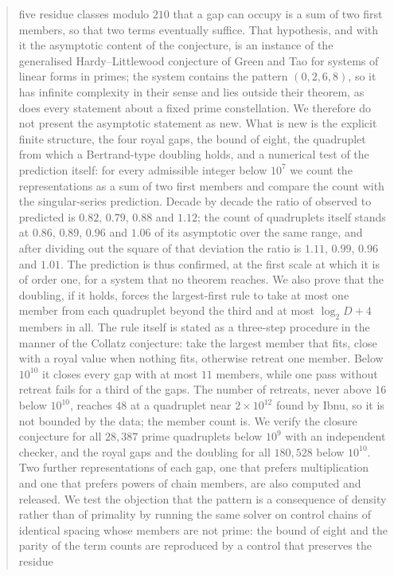 \documentclass[11pt,a4paper]{article}
\begin{document}
\begin{abstract}
five residue classes modulo $210$ that a gap can occupy is a sum of two
first members, so that two terms eventually suffice. That hypothesis, and
with it the asymptotic content of the conjecture, is an instance of the
generalised Hardy--Littlewood conjecture of Green and Tao for systems of
linear forms in primes; the system contains the pattern $(0,2,6,8)$, so it
has infinite complexity in their sense and lies outside their theorem, as
does every statement about a fixed prime constellation. We therefore do not
present the asymptotic statement as new. What is new is the explicit
finite structure, the four royal gaps, the bound of eight, the quadruplet
from which a Bertrand-type doubling holds, and a numerical test of the
prediction itself: for every admissible integer below $10^7$ we count the
representations as a sum of two first members and compare the count with
the singular-series prediction. Decade by decade the ratio of observed to
predicted is $0.82$, $0.79$, $0.88$ and $1.12$; the count of quadruplets
itself stands at $0.86$, $0.89$, $0.96$ and $1.06$ of its asymptotic over
the same range, and after dividing out the square of that deviation the
ratio is $1.11$, $0.99$, $0.96$ and $1.01$. The prediction is thus
confirmed, at the first scale at which it is of order one, for a system
that no theorem reaches. We also prove that the doubling, if it
holds, forces the largest-first rule to take at most one member from each
quadruplet beyond the third and at most $\log_2 D+4$ members in all. The rule itself is stated as a
three-step procedure in the manner of the Collatz conjecture: take the
largest member that fits, close with a royal value when nothing fits,
otherwise retreat one member. Below $10^{10}$ it closes every gap with at most
$11$ members, while one pass without retreat fails for a third of the gaps. The
number of retreats, never above $16$ below $10^{10}$, reaches $48$ at a
quadruplet near $2\times10^{12}$ found by Ibnu, so it is not bounded by the
data; the member count is. We verify the closure conjecture
for all $28{,}387$ prime quadruplets below $10^9$ with an independent
checker, and the royal gaps and the doubling for all $180{,}528$ below $10^{10}$. Two further
representations of each gap, one that prefers multiplication and one that
prefers powers of chain members, are also computed and released. We test
the objection that the pattern is a consequence of density rather than of
primality by running the same solver on control chains of identical
spacing whose members are not prime: the bound of eight and the parity of
the term counts are reproduced by a control that preserves the residue

\end{abstract}
\end{document}
